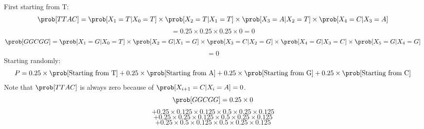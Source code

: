 First starting from T:
$$
\prob[TTAC] = \prob[X_1 = T|X_0 = T]\times\prob[X_2 = T|X_1 = T]\times\prob[X_3 = A|X_2 = T]\times\prob[X_4 = C|X_3 = A]
$$
$$
= 0.25\times0.25\times0.25\times0 = 0
$$
$$
\prob[GGCGG] = \prob[X_1 = G|X_0 = T]\times\prob[X_2 = G|X_1 = G]\times\prob[X_3 = C|X_2 = G]\times\prob[X_4 = G|X_3 = C]\times\prob[X_5 = G|X_4 = G]
$$
$$
= 0
$$
Starting randomly:
$$
P = 0.25\times\prob[\text{Starting from T}] + 0.25\times\prob[\text{Starting from A}] + 0.25\times\prob[\text{Starting from G}] + 0.25\times\prob[\text{Starting from C}]
$$
Note that $\prob[TTAC]$ is always zero because of $\prob[X_{i + 1} = C|X_i = A] = 0$.
$$
\prob[GGCGG] = 0.25\times0 
$$
$$
+ 0.25\times 0.125\times0.125\times0.5\times0.25\times0.125
$$
$$
+ 0.25\times 0.25\times0.125\times0.5\times0.25\times0.125
$$
$$
+ 0.25\times 0.5\times0.125\times0.5\times0.25\times0.125
$$